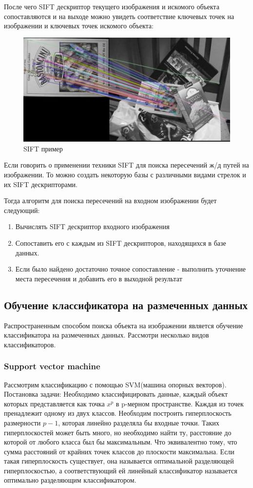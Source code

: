 После чего SIFT дескриптор текущего изображения и искомого объекта сопоставляются и на выходе можно увидеть соответствие ключевых точек на изображении и ключевых точек искомого объекта:
\begin{figure}[!h]
	\centering
	\includegraphics[width=1\linewidth]{pictures/screenshot011}
	\caption{SIFT пример}
	\label{fig:screenshot011}
\end{figure}

Если говорить о применении техники SIFT для поиска пересечений ж/д путей на изображении. То можно создать некоторую базы с различными видами стрелок и их SIFT дескрипторами. 

Тогда алгоритм для поиска пересечений на входном изображении будет следующий:
\begin{enumerate}
	\item Вычислять SIFT дескриптор входного изображения
	\item Сопоставить его с каждым из SIFT дескрипторов, находящихся в базе данных.
	\item Если было найдено достаточно точное сопоставление - выполнить уточнение места пересечения и добавить его в выходной результат
\end{enumerate}

\subsection{Обучение классификатора на размеченных данных}
Распространенным способом поиска объекта на изображении является обучение классификатора на размеченных данных. Рассмотри несколько видов классификаторов.
\subsubsection{Support vector machine}
\label{SVM}
Рассмотрим классификацию с помощью SVM(машина опорных векторов)\cite{b:SVM}.
Постановка задачи: \newline
Необходимо классифицировать данные, каждый объект которых представляется как точка $x^p$ в p-мерном пространстве. Каждая из точек пренадлежит одному из двух классов. Необходим построить гиперплоскость размерности $p-1$, которая линейно разделяла бы входные точки. 
Таких гиперплоскостей может быть много, но необходимо найти ту, расстояние до которой от любого класса был бы максимальным. Что эквивалентно тому, что сумма расстояний от крайних точек классов до плоскости максимальна. 
Если такая гиперплоскость существует, она называется оптимальной разделяющей гиперплоскостью, а соответствующий ей линейный классификатор называется оптимально разделяющим классификатором.

